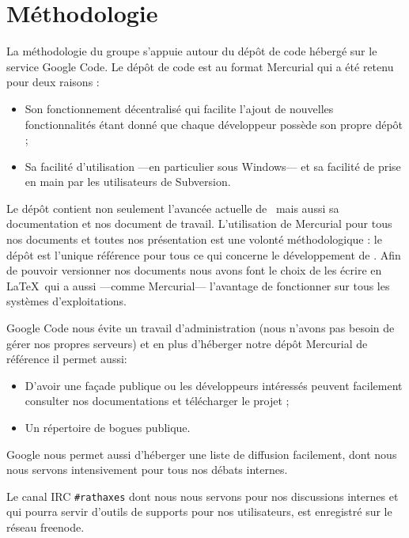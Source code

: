 \documentclass[francais]{rtxreport}
\begin{document}

\section{Méthodologie}

La méthodologie du groupe s'appuie autour du dépôt de code hébergé sur le
service Google Code. Le dépôt de code est au format Mercurial qui a été retenu
pour deux raisons :
\begin{itemize}
\item Son fonctionnement décentralisé qui facilite l'ajout de nouvelles
  fonctionnalités étant donné que chaque développeur possède son propre dépôt ;
\item Sa facilité d'utilisation ---en particulier sous Windows--- et sa facilité
  de prise en main par les utilisateurs de Subversion.
\end{itemize}

Le dépôt contient non seulement l'avancée actuelle de \rtx\ mais aussi sa
documentation et nos document de travail. L'utilisation de Mercurial pour tous
nos documents et toutes nos présentation est une volonté méthodologique : le
dépôt est l'unique référence pour tous ce qui concerne le développement de \rtx.
Afin de pouvoir versionner nos documents nous avons font le choix de les écrire
en \LaTeX\ qui a aussi ---comme Mercurial--- l'avantage de fonctionner sur tous
les systèmes d'exploitations.

Google Code nous évite un travail d'administration (nous n'avons pas besoin de
gérer nos propres serveurs) et en plus d'héberger notre dépôt Mercurial de
référence il permet aussi:
\begin{itemize}
\item D'avoir une façade publique ou les développeurs intéressés peuvent
  facilement consulter nos documentations et télécharger le projet ;
\item Un répertoire de bogues publique.
\end{itemize}
Google nous permet aussi d'héberger une liste de diffusion facilement, dont nous
nous servons intensivement pour tous nos débats internes.

Le canal IRC \texttt{\#rathaxes} dont nous nous servons pour nos discussions
internes et qui pourra servir d'outils de supports pour nos utilisateurs, est
enregistré sur le réseau freenode.
\end{document}
